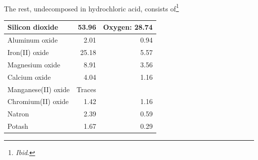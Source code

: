\documentclass[a4paper, 12pt, oneside]{article}
\begin{document}
\paragraph*{}
The rest, undecomposed in hydrochloric acid, consists of\footnote{\emph{Ibid}.}
\begin{center}
    \begin{tabular}{ |l|r|r| } 
    \hline
    Silicon dioxide & 53.96 & Oxygen: 28.74\\\hline
    Aluminum oxide & 2.01 & 0.94\\\hline
    Iron(II) oxide & 25.18 & 5.57\\\hline
    Magnesium oxide & 8.91 & 3.56\\\hline
    Calcium oxide & 4.04 & 1.16\\\hline
    Manganese(II) oxide & Traces &\\\hline
    Chromium(II) oxide & 1.42 & 1.16\\\hline
    Natron & 2.39 & 0.59\\\hline
    Potash & 1.67 & 0.29\\
    \hline
    \end{tabular}
\end{center}
\end{document}
